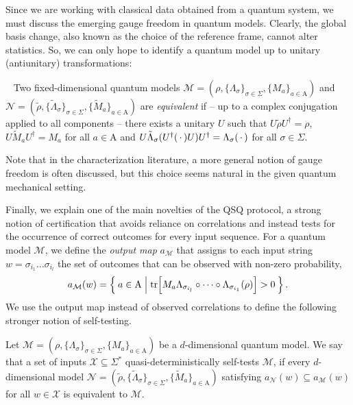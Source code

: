 \documentclass[../main.tex]{subfiles}
\begin{document}
Since we are working with classical data obtained from a quantum system, we must discuss the emerging gauge freedom in quantum models. Clearly, the global basis change, also known as the choice of the reference frame, cannot alter statistics. So, we can only hope to identify a quantum model up to unitary (antiunitary) transformations: 

\begin{definition}~\label{def:modelequivalence}
Two fixed-dimensional quantum models $\mathcal{M} = (\rho,\{\Lambda_\sigma\}_{\sigma \in \Sigma},\{M_a\}_{a\in \mathrm{A}})$ and $\mathcal{N}=(\tilde\rho,\{\tilde\Lambda_\sigma \}_{\sigma \in \Sigma},\{\tilde M_a\}_{a\in \mathrm{A}})$ are \emph{equivalent} if -- up to a complex conjugation applied to all components -- there exists a unitary $U$ such that $U\tilde\rho U^\dagger = \rho$, $U\tilde M_a U^\dagger = M_a$ for all $a\in \mathrm{A}$ and $ U\tilde\Lambda_\sigma(U^\dagger (\,\cdot\,) U)U^\dagger=\Lambda_\sigma(\,\cdot\,)$ for all $\sigma\in \Sigma$. %
\end{definition}
Note that in the characterization literature, a more general notion of gauge freedom is often discussed, but this choice seems natural in the given quantum mechanical setting.


Finally, we explain one of the main novelties of the QSQ protocol, a strong notion of certification that avoids reliance on correlations and instead tests for the occurrence of correct outcomes for every input sequence.
For a quantum model $\mathcal{M}$, we define the \emph{output map} $a_\mathcal{M}$
that assigns to each input string $w=\sigma_{i_1}\dots \sigma_{i_l}$ the set of outcomes that can be observed with non-zero probability, 
\begin{equation}
    a_\mathcal{M}(w)= \Set{a\in \mathrm{A} | \tr[M_a \Lambda_{\sigma_{i_l}}\circ\dots \circ\Lambda_{\sigma_{i_1}}(\rho)]>0}. 
\end{equation}
We use the output map instead of observed correlations to define the following stronger notion of self-testing.

\begin{definition}
\label{def:self-testing}
    Let $\mathcal{M} = (\rho,\{\Lambda_\sigma\}_{ \sigma \in \Sigma},\{M_a\}_{a\in \mathrm{A}})$ be a $d$-dimensional quantum model. 
    We say that a set of inputs $\mathcal{X}\subseteq \Sigma^*$ quasi-deterministically self-tests $\mathcal{M}$, if every $d$-dimensional model $\mathcal{N}=(\tilde\rho,\{\tilde\Lambda_{\sigma}\}_{\sigma \in \Sigma},\{\tilde M_a\}_{a\in \mathrm{A}})$ satisfying $a_\mathcal{N}(w) \subseteq a_{\mathcal{M}}(w)$ for all $w\in\mathcal{X} $  is equivalent to $\mathcal{M}$.
\end{definition}
\end{document}
